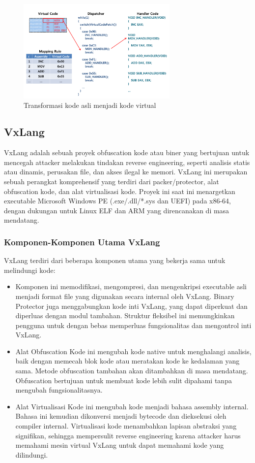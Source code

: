 \begin{figure}
	\centering
	\includegraphics[width=0.7\textwidth]
	{assets/pics/code_to_virtualized.png}
	\caption{Transformasi kode asli menjadi kode virtual \cite{Don20}}
	\label{F:transformation_virtualization}
\end{figure}

\subsection{VxLang}
VxLang adalah sebuah proyek obfuscation kode atau biner yang bertujuan untuk mencegah attacker melakukan tindakan reverse engineering, seperti analisis statis atau dinamis, perusakan file, dan akses ilegal ke memori. VxLang ini merupakan sebuah perangkat komprehensif yang terdiri dari packer/protector, alat obfuscation kode, dan alat virtualisasi kode. Proyek ini saat ini menargetkan executable Microsoft Windows PE (.exe/.dll/*.sys dan UEFI) pada x86-64, dengan dukungan untuk Linux ELF dan ARM yang direncanakan di masa mendatang.
\subsubsection{Komponen-Komponen Utama VxLang}
VxLang terdiri dari beberapa komponen utama yang bekerja sama untuk melindungi kode:
\begin{itemize}
	\item {} Komponen ini memodifikasi, mengompresi, dan mengenkripsi executable asli menjadi format file yang digunakan secara internal oleh VxLang. Binary Protector juga menggabungkan kode inti VxLang, yang dapat diperkuat dan diperluas dengan modul tambahan. Struktur fleksibel ini memungkinkan pengguna untuk dengan bebas memperluas fungsionalitas dan mengontrol inti VxLang.
	\item {} Alat Obfuscation Kode ini mengubah kode native untuk menghalangi analisis, baik dengan memecah blok kode atau meratakan kode ke kedalaman yang sama. Metode obfuscation tambahan akan ditambahkan di masa mendatang. Obfuscation bertujuan untuk membuat kode lebih sulit dipahami tanpa mengubah fungsionalitasnya.
	\item {} Alat Virtualisasi Kode ini mengubah kode menjadi bahasa assembly internal. Bahasa ini kemudian dikonversi menjadi bytecode dan dieksekusi oleh compiler internal. Virtualisasi kode menambahkan lapisan abstraksi yang signifikan, sehingga mempersulit reverse engineering karena attacker harus memahami mesin virtual VxLang untuk dapat memahami kode yang dilindungi.
\end{itemize}

